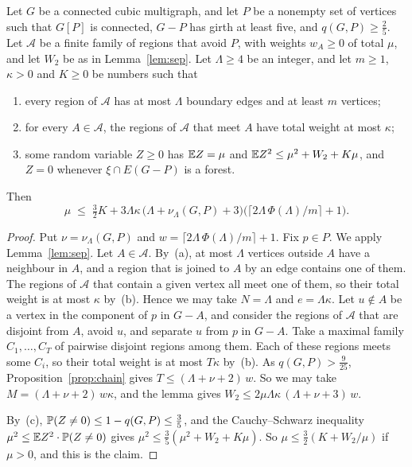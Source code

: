 \begin{proposition}\label{prop:heavy}
Let $G$ be a connected cubic multigraph, and let $P$ be a nonempty set of vertices such that
$G[P]$ is connected, $G-P$ has girth at least five, and $q(G,P)\ge\frac25$. Let $\mathcal A$ be a
finite family of regions that avoid $P$, with weights $w_A\ge0$ of total $\mu$, and let $W_2$ be
as in Lemma~\ref{lem:sep}. Let $\Lambda\ge4$ be an integer, and let $m\ge1$, $\kappa>0$ and
$K\ge0$ be numbers such that
\begin{enumerate}
\item[\textup{(a)}] every region of $\mathcal A$ has at most $\Lambda$ boundary edges and at
least $m$ vertices;
\item[\textup{(b)}] for every $A\in\mathcal A$, the regions of $\mathcal A$ that meet $A$ have
total weight at most $\kappa$;
\item[\textup{(c)}] some random variable $Z\ge0$ has $\mathbb{E} Z=\mu$ and
$\mathbb{E} Z^{2}\le\mu^{2}+W_2+K\mu$, and $Z=0$ whenever $\xi\cap E(G-P)$ is a forest.
\end{enumerate}
Then
\[
  \mu\;\le\;\tfrac32K+3\Lambda\kappa\,\bigl(\Lambda+\nu_\Lambda(G,P)+3\bigr)
  \bigl(\lceil2\Lambda\,\Phi(\Lambda)/m\rceil+1\bigr).
\]
\end{proposition}

\begin{proof}
Put $\nu=\nu_\Lambda(G,P)$ and $w=\lceil2\Lambda\,\Phi(\Lambda)/m\rceil+1$. Fix $p\in P$. We apply
Lemma~\ref{lem:sep}. Let $A\in\mathcal A$. By~(a), at most $\Lambda$ vertices outside $A$ have a
neighbour in $A$, and a region that is joined to $A$ by an edge contains one of them. The
regions of $\mathcal A$ that contain a given vertex all meet one of them, so their total weight
is at most $\kappa$ by~(b). Hence we may take $N=\Lambda$ and $e=\Lambda\kappa$. Let $u\notin A$
be a vertex in the component of $p$ in $G-A$, and consider the regions of $\mathcal A$ that are
disjoint from $A$, avoid $u$, and separate $u$ from $p$ in $G-A$. Take a maximal family
$C_1,\dots,C_T$ of pairwise disjoint regions among them. Each of these regions meets some $C_i$,
so their total weight is at most $T\kappa$ by~(b). As $q(G,P)>\frac9{25}$,
Proposition~\ref{prop:chain} gives $T\le(\Lambda+\nu+2)\,w$. So we may take
$M=(\Lambda+\nu+2)\,w\kappa$, and the lemma gives $W_2\le2\mu\Lambda\kappa\,(\Lambda+\nu+3)\,w$.

By~(c), $\mathbb{P}(Z\ne0)\le1-q(G,P)\le\frac35$, and the Cauchy--Schwarz inequality
$\mu^{2}\le\mathbb{E} Z^{2}\cdot\mathbb{P}(Z\ne0)$ gives $\mu^{2}\le\frac35(\mu^{2}+W_2+K\mu)$. So
$\mu\le\frac32(K+W_2/\mu)$ if $\mu>0$, and this is the claim.
\end{proof}

